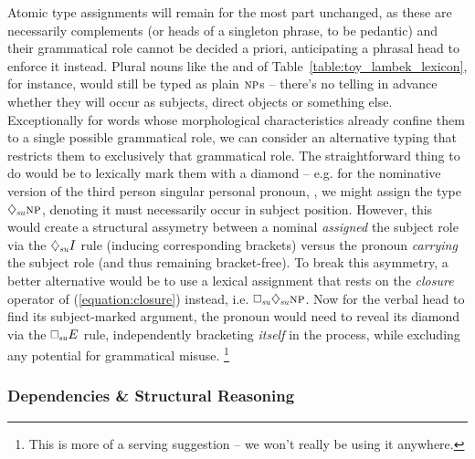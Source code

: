 Atomic type assignments will remain for the most part unchanged, as these are necessarily complements (or heads of a singleton phrase, to be pedantic) and their grammatical role cannot be decided a priori, anticipating a phrasal head to enforce it instead.
Plural nouns like the  and  of Table~\ref{table:toy_lambek_lexicon}, for instance, would still be typed as plain  $\np[s]$s -- there's no telling in advance whether they will occur as subjects, direct objects or something else.
Exceptionally for words whose morphological characteristics already confine them to a single possible grammatical role, we can consider an alternative typing that restricts them to exclusively that grammatical role.
The straightforward thing to do would be to lexically mark them with a diamond -- e.g. for the nominative version of the third person singular personal pronoun, , we might assign the type $\ddia{su}\np[s]$, denoting it must necessarily occur in subject position.
However, this would create a structural assymetry between a nominal \textit{assigned} the subject role via the $\ddia{su} I$ rule (inducing corresponding brackets) versus the pronoun \textit{carrying} the subject role (and thus remaining bracket-free).
To break this asymmetry, a better alternative would be to use a lexical assignment that rests on the \textit{closure} operator of (\ref{equation:closure}) instead, i.e. $\dbox{su}\ddia{su}\np[s]$.
Now for the verbal head to find its subject-marked argument, the pronoun would need to reveal its diamond via the $\dbox{su} E$ rule, independently bracketing \textit{itself} in the process, while excluding any potential for grammatical misuse.%
	\footnote{This is more of a serving suggestion -- we won't really be using it anywhere.}

\subsubsection{Dependencies \& Structural Reasoning}
\label{subsubsection:sreason_dep}

